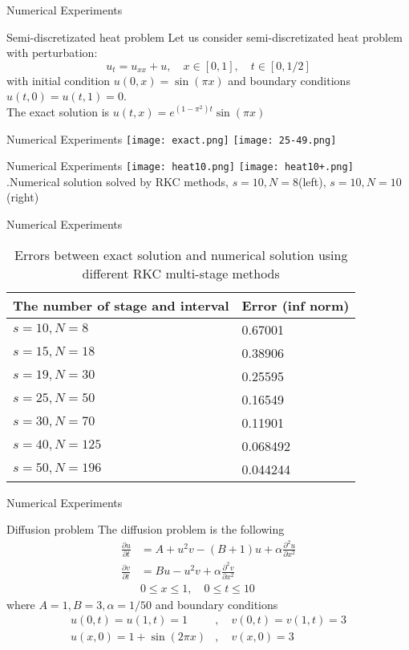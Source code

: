 \documentclass{beamer}
\begin{document}
\begin{frame}{Numerical Experiments}
\begin{block}{Semi-discretizated heat problem}
	Let us consider semi-discretizated heat problem with perturbation:
	$$u_t=u_{xx}+u, \quad x \in \left[0,1\right], \quad t \in \left[0,1/2\right]$$ with initial condition $u(0,x)=\sin(\pi x)$ and boundary conditions $u(t,0)=u(t,1)=0$.\\
	The exact solution is $u(t,x)=e^{(1-\pi^2)t} \sin(\pi x)$
\end{block}	
\end{frame}
\begin{frame}{Numerical Experiments}
	\texttt{[image: exact.png]}
	\texttt{[image: 25-49.png]}
\end{frame}

\begin{frame}{Numerical Experiments}
	\texttt{[image: heat10.png]}
	\texttt{[image: heat10+.png]}
	\figurename{.Numerical solution solved by RKC methods, $s=10,N=8$(left),  $s=10,N=10$(right) }
\end{frame}
\begin{frame}{Numerical Experiments}
	\begin{table}
		\begin{tabular}{ | m{10em} | m{3.5cm}|  }  
			\hline
			The number of stage and interval & Error (inf norm)\\
			\hline
			$s=10 , N=8$ &  0.67001\\
			\hline 
			$s=15 , N=18$ & 0.38906 \\
			\hline
			$s=19 , N=30$ & 0.25595 \\
			\hline
			$s=25 , N=50$ & 0.16549 \\
			\hline
				$s=30 , N=70$ & 0.11901 \\
			\hline
			$s=40 , N=125$ & 0.068492 \\
			\hline
			$s=50 , N=196$ & 0.044244 \\
			\hline
			
		\end{tabular}
	\caption{Errors between exact solution and numerical solution using different RKC multi-stage methods }
\end{table}
\end{frame}
\begin{frame}{Numerical Experiments}
	\begin{block}{Diffusion problem}
			The diffusion problem is the following
		$$\begin{aligned}\frac{\partial u}{\partial t}&=A+u^2v-(B+1)u+\alpha \frac{\partial^2u}{\partial x^2} \\ \frac{\partial v}{\partial t}&=Bu-u^2v+\alpha \frac{\partial^2v}{\partial x^2} \\
			& 0 \le x \le 1, \quad 0 \le t \le 10 \end{aligned}$$
		where $A=1,B=3, \alpha = 1/50$ and boundary conditions $$\begin{aligned} u(0,t)=u(1,t)=1&, \quad v(0,t)=v(1,t)=3 \\
			u(x,0)=1+\sin(2\pi x)&, \quad v(x,0)=3 \end{aligned}$$		
	\end{block}
\end{frame}
\end{document}
